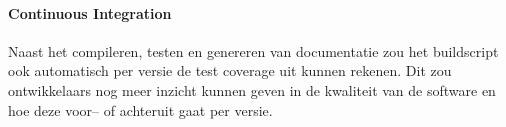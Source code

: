 \paragraph{Continuous Integration} Naast het compileren, testen en genereren van documentatie zou het buildscript ook automatisch per versie de test coverage uit kunnen rekenen. Dit zou ontwikkelaars nog meer inzicht kunnen geven in de kwaliteit van de software en hoe deze voor– of achteruit gaat per versie.
